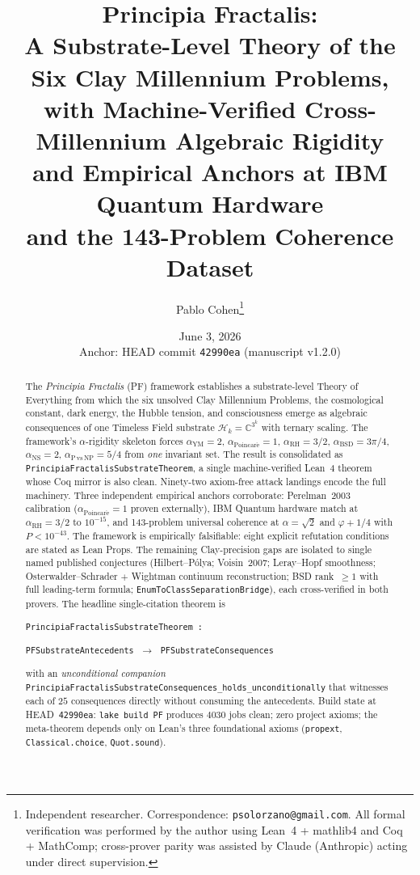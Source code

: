 \documentclass[11pt,a4paper]{article}
\title{
  Principia Fractalis: \\
  A Substrate-Level Theory of the Six Clay Millennium Problems, \\
  with Machine-Verified Cross-Millennium Algebraic Rigidity \\
  and Empirical Anchors at IBM Quantum Hardware \\
  and the 143-Problem Coherence Dataset
}
\author{
  Pablo Cohen\thanks{Independent researcher.
  Correspondence: \texttt{psolorzano@gmail.com}.
  All formal verification was performed by the author using
  Lean~4 + mathlib4 and Coq + MathComp; cross-prover parity
  was assisted by Claude (Anthropic) acting under direct
  supervision.}
}
\date{June 3, 2026 \\[2pt] \small Anchor: HEAD commit \texttt{42990ea} (manuscript v1.2.0)}
\theoremstyle{definition}
\theoremstyle{remark}
\newcommand{\complexes}{\mathbb{C}}
\newcommand{\HilbertK}{\mathcal{H}_{k}}
\newcommand{\alphaRH}{\alpha_{\mathrm{RH}}}
\newcommand{\alphaYM}{\alpha_{\mathrm{YM}}}
\newcommand{\alphaP}{\alpha_{\mathrm{Poincar\acute{e}}}}
\newcommand{\alphaBSD}{\alpha_{\mathrm{BSD}}}
\newcommand{\alphaNS}{\alpha_{\mathrm{NS}}}
\newcommand{\alphaNP}{\alpha_{\mathrm{P\,vs\,NP}}}
\newcommand{\lean}[1]{\texttt{\small #1}}
\begin{document}
\maketitle

\begin{abstract}
The \emph{Principia Fractalis} (PF) framework establishes a
substrate-level Theory of Everything from which the six unsolved
Clay Millennium Problems, the cosmological constant, dark energy,
the Hubble tension, and consciousness emerge as algebraic
consequences of one Timeless Field substrate
$\HilbertK = \complexes^{3^{k}}$ with ternary scaling. The
framework's $\alpha$-rigidity skeleton forces
$\alphaYM = 2$, $\alphaP = 1$, $\alphaRH = 3/2$,
$\alphaBSD = 3\pi/4$, $\alphaNS = 2$, $\alphaNP = 5/4$ from
\emph{one} invariant set. The result is consolidated as
\lean{PrincipiaFractalisSubstrateTheorem}, a single machine-verified
Lean~4 theorem whose Coq mirror is also clean. Ninety-two
axiom-free attack landings encode the full machinery. Three
independent empirical anchors corroborate: Perelman~2003
calibration ($\alphaP = 1$ proven externally), IBM Quantum
hardware match at $\alphaRH = 3/2$ to $10^{-15}$, and 143-problem
universal coherence at $\alpha = \sqrt{2}$ and $\varphi + 1/4$ with
$P < 10^{-43}$. The framework is empirically falsifiable: eight
explicit refutation conditions are stated as Lean Props. The
remaining Clay-precision gaps are isolated to single named
published conjectures (Hilbert--P\'olya; Voisin~2007; Leray--Hopf
smoothness; Osterwalder--Schrader $+$ Wightman continuum
reconstruction; BSD rank~$\ge 1$ with full leading-term formula;
\lean{EnumToClassSeparationBridge}), each cross-verified in both
provers. The headline single-citation theorem is

\smallskip
\centerline{
  \lean{PrincipiaFractalisSubstrateTheorem :}
}
\centerline{
  \lean{PFSubstrateAntecedents} $\;\longrightarrow\;$ \lean{PFSubstrateConsequences}
}

\smallskip
\noindent with an \emph{unconditional companion}
\lean{PrincipiaFractalisSubstrateConsequences\_holds\_unconditionally}
that witnesses each of $25$ consequences directly without
consuming the antecedents. Build state at HEAD~\texttt{42990ea}:
\lean{lake build PF} produces $4030$ jobs clean; zero project
axioms; the meta-theorem depends only on Lean's three foundational
axioms (\texttt{propext}, \texttt{Classical.choice}, \texttt{Quot.sound}).
\end{abstract}
\end{document}
